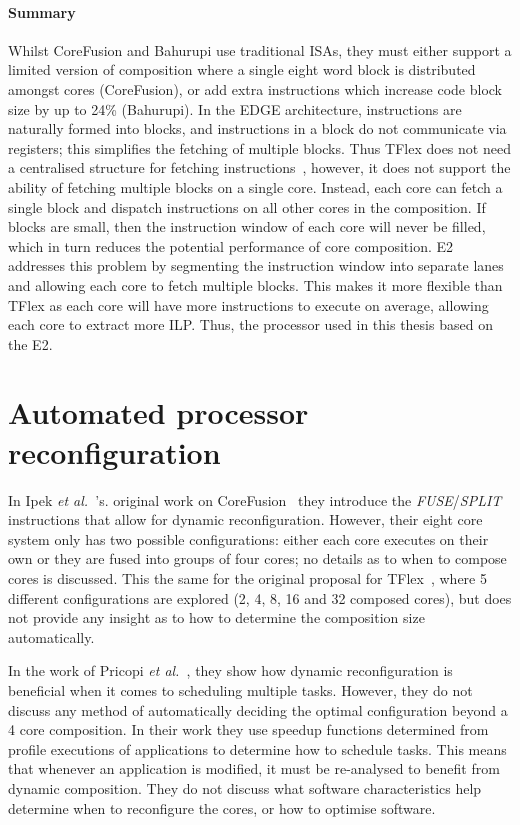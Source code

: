 \paragraph*{Summary}
Whilst CoreFusion and Bahurupi use traditional ISAs, they must either support a limited version of composition where a single eight word block is distributed amongst cores (CoreFusion), or add extra instructions which increase code block size by up to 24\% (Bahurupi).
In the EDGE architecture, instructions are naturally formed into blocks, and instructions in a block do not communicate via registers; this simplifies the fetching of multiple blocks.
Thus TFlex does not need a centralised structure for fetching instructions~\cite{kim2007tflex}, however, it does not support the ability of fetching multiple blocks on a single core.
Instead, each core can fetch a single block and dispatch instructions on all other cores in the composition.
If blocks are small, then the instruction window of each core will never be filled, which in turn reduces the potential performance of core composition.
E2 addresses this problem by segmenting the instruction window into separate lanes and allowing each core to fetch multiple blocks.
This makes it more flexible than TFlex as each core will have more instructions to execute on average, allowing each core to extract more ILP.
Thus, the processor used in this thesis based on the E2.

\section{Automated processor reconfiguration}

In Ipek {\it et al.~}'s. original work on CoreFusion~\cite{ipek2007CoreFusion} they introduce the \textit{FUSE}/\textit{SPLIT} instructions that allow for dynamic reconfiguration.
However, their eight core system only has two possible configurations: either each core executes on their own or they are fused into groups of four cores; no details as to when to compose cores is discussed.
This the same for the original proposal for TFlex~\cite{kim2007tflex}, where 5 different configurations are explored (2, 4, 8, 16 and 32 composed cores), but does not provide any insight as to how to determine the composition size automatically.

In the work of Pricopi {\it et al.~}\cite{pricopiSchedCoreComp2014}, they show how dynamic reconfiguration is beneficial when it comes to scheduling multiple tasks.
However, they do not discuss any method of automatically deciding the optimal configuration beyond a 4 core composition.
In their work they use speedup functions determined from profile executions of applications to determine how to schedule tasks.
This means that whenever an application is modified, it must be re-analysed to benefit from dynamic composition.
They do not discuss what software characteristics help determine when to reconfigure the cores, or how to optimise software.

